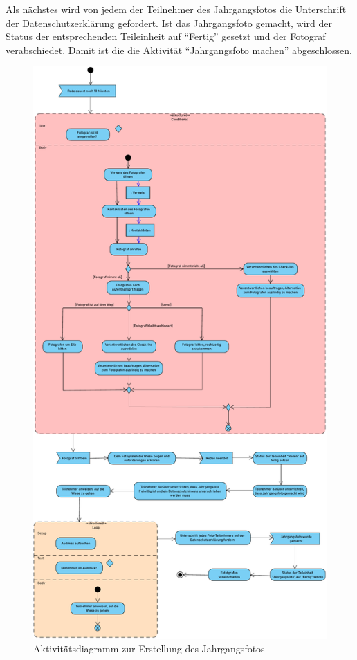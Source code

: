Als nächstes wird von jedem der Teilnehmer des Jahrgangsfotos die Unterschrift der Datenschutzerklärung gefordert. Ist das Jahrgangsfoto gemacht, wird der Status der entsprechenden Teileinheit auf \enquote{Fertig} gesetzt und der Fotograf verabschiedet. Damit ist die die Aktivität \enquote{Jahrgangsfoto machen} abgeschlossen.
\begin{figure}[ht!]
    \centering
    \includegraphics[width=0.6\columnwidth]{Bilder/act_Jahrgangsfoto_machen.pdf}
    \caption{Aktivitätsdiagramm zur Erstellung des Jahrgangsfotos}
    \label{act:jahrgangsfoto-machen}
\end{figure}

\FloatBarrier

